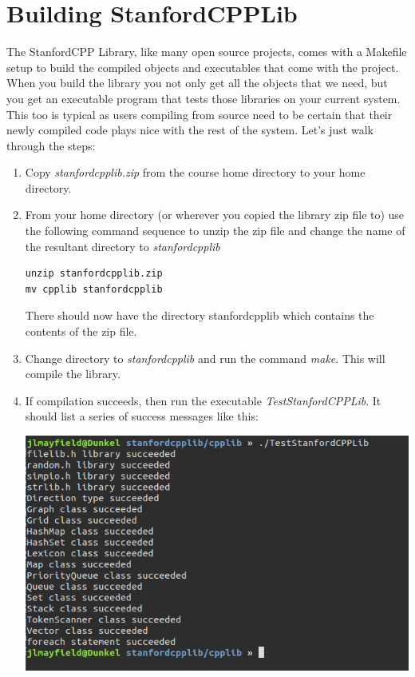 \documentclass[10pt]{article}
\begin{document}
\section{ Building StanfordCPPLib }

The StanfordCPP Library, like many open source projects, comes with a Makefile setup to build the compiled objects and executables that come with the project. When you build the library you not only get all the objects that we need, but you get an executable program that tests those libraries on your current system. This too is typical as users compiling from source need to be certain that their newly compiled code plays nice with the rest of the system. Let's just walk through the steps:

\begin{enumerate}
\item Copy \textit{stanfordcpplib.zip} from the course home directory to your home directory.
\item From your home directory (or wherever you copied the library zip file to) use the following command sequence to unzip the zip file and change the name of the resultant directory to \textit{stanfordcpplib}
\begin{verbatim}
unzip stanfordcpplib.zip
mv cpplib stanfordcpplib
\end{verbatim}
There should now have the directory stanfordcpplib which contains the contents of the zip file.
\item Change directory to \textit{stanfordcpplib} and run the command \textit{make}. This will compile the library.
\item If compilation succeeds, then run the executable \textit{TestStanfordCPPLib}. It should list a series of success messages like this:
\vspace{.1in}
\begin{center}
\includegraphics[scale=.5]{scpplib-testspassed.png}
\end{center}
\vspace{.1in}


\end{enumerate}
\end{document}
